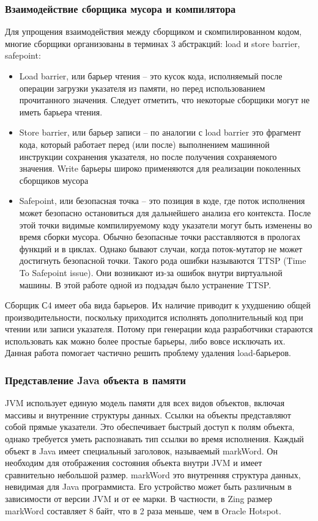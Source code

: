 \subsubsection{Взаимодействие сборщика мусора и компилятора}
Для упрощения взаимодействия между сборщиком и скомпилированном кодом, многие сборщики организованы в терминах 3 абстракций: load и store barrier, safepoint\cite{gc-llvm}:
\begin{itemize}
	\item Load barrier, или барьер чтения – это кусок кода, исполняемый после операции загрузки указателя из памяти, но перед использованием прочитанного значения. Следует отметить, что некоторые сборщики могут не иметь барьера чтения.
	\item Store barrier, или барьер записи  – по аналогии с load barrier это фрагмент кода, который работает перед (или после) выполнением машинной инструкции сохранения указателя, но после получения сохраняемого значения.
	Write барьеры широко применяются для реализации поколенных сборщиков мусора
	\item Safepoint, или безопасная точка – это позиция в коде, где поток исполнения может безопасно остановиться для дальнейшего анализа его контекста. После этой точки видимые компилируемому коду указатели могут быть изменены во время сборки мусора\cite{gc-handbook}. 
	Обычно безопасные точки расставляются в прологах функций и в циклах. Однако бывают случаи, когда поток-мутатор не может достигнуть безопасной точки. Такого рода ошибки называются TTSP (Time To Safepoint issue). 
	Они возникают из-за ошибок внутри виртуальной машины. В этой работе одной из подзадач было устранение TTSP.
\end{itemize}
Сборщик С4 имеет оба вида барьеров. Их наличие приводит к ухудшению общей производительности, поскольку приходится исполнять дополнительный код при чтении или записи указателя. 
Потому при генерации кода разработчики стараются использовать как можно более простые барьеры, либо вовсе исключать их. 
Данная работа помогает частично решить проблему удаления load-барьеров.

\subsubsection{Представление Java объекта в памяти}
JVM использует единую модель памяти для всех видов объектов, включая массивы и внутренние структуры данных. 
Ссылки на объекты представляют собой прямые указатели. Это обеспечивает быстрый доступ к полям объекта, однако требуется уметь распознавать тип ссылки во время исполнения. 
Каждый объект в Java имеет специальный заголовок, называемый markWord. Он необходим для отображения состояния объекта внутри JVM и имеет сравнительно небольшой размер. 
markWord это внутренняя структура данных, невидимая для Java программиста. Его устройство может быть различным в зависимости от версии JVM и от ее марки. 
В частности, в Zing размер markWord составляет 8 байт, что в 2 раза меньше, чем в Oracle Hotspot. 

